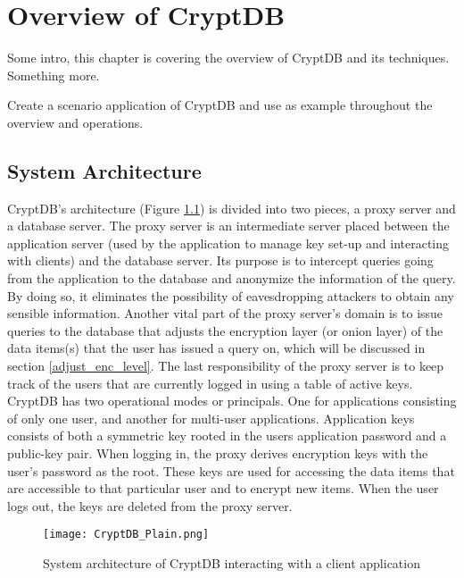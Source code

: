 \chapter{Overview of CryptDB}
\label{chp:overview_cryptDB}


Some intro, this chapter is covering the overview of CryptDB and its techniques. Something more.


Create a scenario application of CryptDB and use as example throughout the overview and operations.


\section{System Architecture}

CryptDB's architecture (Figure \ref{cryptdb_plain}) is divided into two pieces, a proxy server and a database server. The proxy server is an intermediate server placed between the application server (used by the application to manage key set-up and interacting with clients) and the database server. Its purpose is to intercept queries going from the application to the database and anonymize the information of the query. By doing so, it eliminates the possibility of eavesdropping attackers to obtain any sensible information. %
Another vital part of the proxy server's domain is to issue queries to the database that adjusts the encryption layer (or onion layer) of the data items(s) that the user has issued a query on, which will be discussed in section \ref{adjust_enc_level}. The last responsibility of the proxy server is to keep track of the users that are currently logged in using a table of active keys. CryptDB has two operational modes or principals. One for applications consisting of only one user, and another for multi-user applications. Application keys consists of both a symmetric key rooted in the users application password and a public-key pair. When logging in, the proxy derives encryption keys with the user's password as the root. These keys are used for accessing the data items that are accessible to that particular user and to encrypt new items. When the user logs out, the keys are deleted from the proxy server.

\begin{figure}[h]
	\texttt{[image: CryptDB\_Plain.png]}
	\caption{System architecture of CryptDB interacting with a client application}
	\label{cryptdb_plain}
\end{figure}


